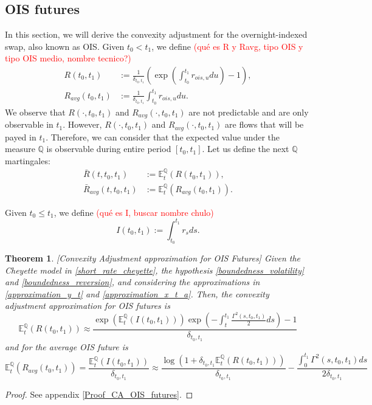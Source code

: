 \documentclass[a4paper,10pt]{article}
\newtheorem{theorem}{Theorem}[section]
\newcommand{\1}{\mathbf{1}}
\begin{document}
\subsection{OIS futures}
In this section, we will derive the convexity adjustment for the overnight-indexed swap, also known as OIS. Given $t_0 < t_1$, we define \textcolor{red}{(qué es R y Ravg, tipo OIS y tipo OIS medio, nombre tecnico?)}
\begin{align*}
R(t_0,t_1) &:=\frac{1}{\delta_{t_0,t_1}} \left(\exp\left(\int_{t_0}^{t_1}r_{ois,u} du \right) - 1\right), \\
R_{avg}(t_0,t_1) &:= \frac{1}{\delta_{t_0,t_1}}\int_{t_0}^{t_1}r_{ois,u} du.
\end{align*}
We observe that $R(\cdot,t_0,t_1)$ and $R_{avg}(\cdot,t_0,t_1)$  are not predictable and are only observable in $t_1$. However, 
$R(\cdot,t_0,t_1)$ and $R_{avg}(\cdot,t_0,t_1)$ are flows that will be payed in $t_1$. Therefore, we can consider that the expected value under the measure $\mathbb{Q}$ is observable during entire period $[t_0, t_1]$. Let us define the next $\mathbb{Q}$ martingales:
\begin{align*} 
\bar{R}(t,t_0,t_1) &:= \mathbb{E}_t^{\mathbb{Q}}\left( R(t_0,t_1)  \right), \\
\bar{R}_{avg}(t,t_0,t_1) &:= \mathbb{E}_t^{\mathbb{Q}}\left( R_{avg}(t_0,t_1)  \right).
\end{align*}

Given $t_0\leq t_1$, we define \textcolor{red}{(qué es I, buscar nombre chulo)}
\begin{equation*}
I(t_0,t_1) := \int_{t_0}^{t_1} r_s ds.
\end{equation*}

\begin{theorem}\label{Th_CA_OIS}[Convexity Adjustment approximation for OIS Futures]
Given the Cheyette model in \eqref{short_rate_cheyette}, the hypothesis \ref{boundedness_volatility} and \ref{boundedness_reversion}, and considering the approximations in \eqref{approximation_y_t} and \eqref{approximation_x_t_a}. Then, the convexity adjustment approximation for OIS futures is 
\begin{equation}\label{convexity_ois_future}
\mathbb{E}_t^{\mathbb{Q}}\left(R(t_0,t_1)\right) \approx \frac{\exp\left(\mathbb{E}_t^{\mathbb{Q}}\left(I(t_0,t_1)\right)\right)\exp\left(-\int_{t}^{t_1}\frac{\Gamma^{2}(s,t_0,t_1)}{2} ds\right) - 1}{\delta_{t_0,t_1}}
\end{equation}
and for the average OIS future is
\begin{equation}\label{convexity_avg_ois_future}
\mathbb{E}_t^{\mathbb{Q}}\left(R_{avg}(t_0,t_1)\right) = \frac{\mathbb{E}_t^{\mathbb{Q}}\left(I(t_0,t_1)\right) }{\delta_{t_0,t_1}} \approx \frac{\log\left(1+\delta_{t_0,t_1}  \mathbb{E}_t^{\mathbb{Q}}\left(R(t_0,t_1)\right) \right)}{\delta_{t_0,t_1}} - \frac{\int_{0}^{t_1}  \Gamma^{2}(s,t_0,t_1) ds}{2\delta_{t_0,t_1}}
\end{equation}
\end{theorem}
\begin{proof}
See appendix \ref{Proof_CA_OIS_futures}.
\end{proof}
\end{document}

